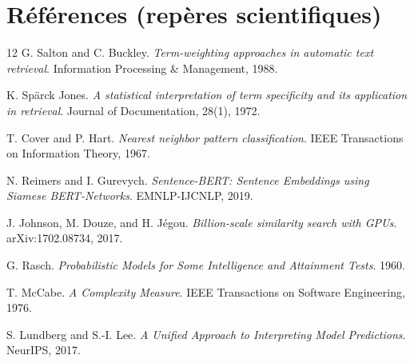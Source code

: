 \documentclass[11pt,a4paper]{article}
\begin{document}
\section{R\'ef\'erences (rep\`eres scientifiques)}
\begin{thebibliography}{12}
G. Salton and C. Buckley. \textit{Term-weighting approaches in automatic text retrieval}. Information Processing \& Management, 1988.

K. Sp\"arck Jones. \textit{A statistical interpretation of term specificity and its application in retrieval}. Journal of Documentation, 28(1), 1972.

T. Cover and P. Hart. \textit{Nearest neighbor pattern classification}. IEEE Transactions on Information Theory, 1967.

N. Reimers and I. Gurevych. \textit{Sentence-BERT: Sentence Embeddings using Siamese BERT-Networks}. EMNLP-IJCNLP, 2019.

J. Johnson, M. Douze, and H. J\'egou. \textit{Billion-scale similarity search with GPUs}. arXiv:1702.08734, 2017.

G. Rasch. \textit{Probabilistic Models for Some Intelligence and Attainment Tests}. 1960.

T. McCabe. \textit{A Complexity Measure}. IEEE Transactions on Software Engineering, 1976.

S. Lundberg and S.-I. Lee. \textit{A Unified Approach to Interpreting Model Predictions}. NeurIPS, 2017.
\end{thebibliography}
\end{document}

